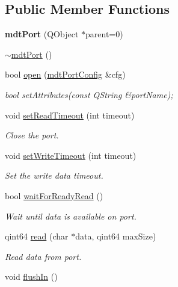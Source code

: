 \subsection*{Public Member Functions}
\begin{DoxyCompactItemize}
\item 
\hypertarget{classmdt_port_ac466eac9d1a54ea0e04c998660ad75ec}{
{\bfseries mdtPort} (QObject $\ast$parent=0)}
\label{classmdt_port_ac466eac9d1a54ea0e04c998660ad75ec}

\item 
\hyperlink{classmdt_port_aa19f56493000459083df371be57f67aa}{$\sim$mdtPort} ()
\item 
bool \hyperlink{classmdt_port_ac7158d1d718dbc6068648bbed1eab747}{open} (\hyperlink{classmdt_port_config}{mdtPortConfig} \&cfg)
\begin{DoxyCompactList}\small\item\em bool setAttributes(const QString \&portName); \end{DoxyCompactList}\item 
void \hyperlink{classmdt_port_aa77b266f23744f1b53ae589f986be101}{setReadTimeout} (int timeout)
\begin{DoxyCompactList}\small\item\em Close the port. \end{DoxyCompactList}\item 
\hypertarget{classmdt_port_a2acb6e7bedacdadf78ee735dc611abfa}{
void \hyperlink{classmdt_port_a2acb6e7bedacdadf78ee735dc611abfa}{setWriteTimeout} (int timeout)}
\label{classmdt_port_a2acb6e7bedacdadf78ee735dc611abfa}

\begin{DoxyCompactList}\small\item\em Set the write data timeout. \end{DoxyCompactList}\item 
bool \hyperlink{classmdt_port_af8737cc14667f6770af7be01759253e2}{waitForReadyRead} ()
\begin{DoxyCompactList}\small\item\em Wait until data is available on port. \end{DoxyCompactList}\item 
qint64 \hyperlink{classmdt_port_ad8a196bb21b6ca76dffb068a1692904a}{read} (char $\ast$data, qint64 maxSize)
\begin{DoxyCompactList}\small\item\em Read data from port. \end{DoxyCompactList}\item 
\hypertarget{classmdt_port_a2fea088c8e5ad4578f521a39c353f7c3}{
void \hyperlink{classmdt_port_a2fea088c8e5ad4578f521a39c353f7c3}{flushIn} ()}
\label{classmdt_port_a2fea088c8e5ad4578f521a39c353f7c3}


\end{DoxyCompactItemize}
